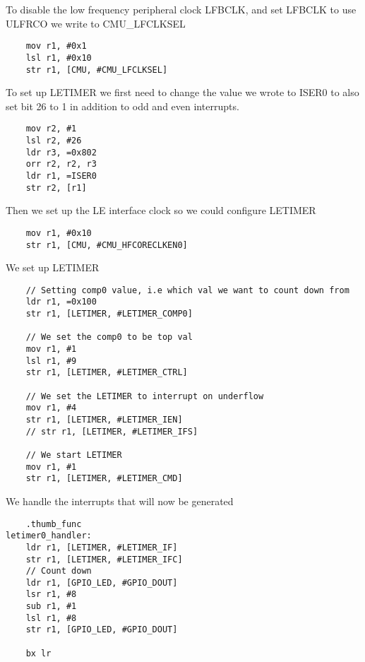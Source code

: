 To disable the low frequency peripheral clock LFBCLK, and set LFBCLK to use ULFRCO we write to CMU\_LFCLKSEL

\begin{lstlisting}
	mov r1, #0x1
	lsl r1, #0x10
	str r1, [CMU, #CMU_LFCLKSEL]
\end{lstlisting}

To set up LETIMER we first need to change the value we wrote to ISER0 to also set bit 26 to 1 in addition to odd and even interrupts.

\begin{lstlisting}
   	mov r2, #1
	lsl r2, #26
	ldr r3, =0x802
	orr r2, r2, r3
	ldr r1, =ISER0
	str r2, [r1]
\end{lstlisting}

Then we set up the LE interface clock so we could configure LETIMER

\begin{lstlisting}
	mov r1, #0x10
	str r1, [CMU, #CMU_HFCORECLKEN0]
\end{lstlisting}

We set up LETIMER

\begin{lstlisting}
	// Setting comp0 value, i.e which val we want to count down from
	ldr r1, =0x100
	str r1, [LETIMER, #LETIMER_COMP0]

	// We set the comp0 to be top val
	mov r1, #1
	lsl r1, #9
	str r1, [LETIMER, #LETIMER_CTRL]

	// We set the LETIMER to interrupt on underflow
	mov r1, #4
	str r1, [LETIMER, #LETIMER_IEN]
	// str r1, [LETIMER, #LETIMER_IFS]

	// We start LETIMER
	mov r1, #1
	str r1, [LETIMER, #LETIMER_CMD]
\end{lstlisting}


We handle the interrupts that will now be generated

\begin{lstlisting}
	.thumb_func
letimer0_handler:
	ldr r1, [LETIMER, #LETIMER_IF] 
	str r1, [LETIMER, #LETIMER_IFC]
	// Count down
	ldr r1, [GPIO_LED, #GPIO_DOUT]
	lsr r1, #8
	sub r1, #1
	lsl r1, #8
	str r1, [GPIO_LED, #GPIO_DOUT]

	bx lr
\end{lstlisting}
